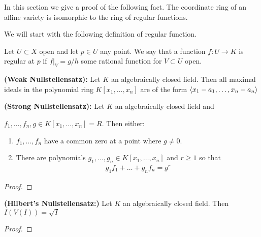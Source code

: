 \documentclass[12pt]{article}
\begin{document}
In this section we give a proof of the following fact. The coordinate ring of an affine variety is isomorphic to the ring of regular functions.

We will start with the following definition of regular function.
\begin{definition}
Let $U\subset X$ open and let $p\in U$ any point. We say that a function $f:U\to K$ is regular at $p$ if $f\vert_V = g/h$ some rational function for $V\subset U$ open.
\end{definition}


\hfill 

\begin{theorem}
\textbf{(Weak Nullstellensatz):} Let $K$ an algebraically closed field. Then all maximal ideals in the polynomial ring $K[x_1,\dots,x_n]$ are of the form $\langle{x_1-a_1,\dots,x_n-a_n}\rangle$
\end{theorem}

\begin{theorem}
\textbf{(Strong Nullstellensatz):} Let $K$ an algebraically closed field and

$f_1,\dots,f_n,g\in K[x_1,\dots,x_n] = R$. Then either:\begin{enumerate}
    \item $f_1,\dots,f_n$ have a common zero at a point where $g\neq 0$.
    \item There are polynomials $g_1,\dots,g_n\in K[x_1,\dots,x_n]$ and $r\geq 1$ so that\begin{align*}
        g_1f_1 + \dots + g_nf_n = g^r
    \end{align*}
\end{enumerate}
\end{theorem}

\begin{proof}
    
\end{proof}

\begin{theorem}
\textbf{(Hilbert's Nullstellensatz:)} Let $K$ an algebraically closed field. Then $I(V(I)) = \sqrt{I}$
\end{theorem}

\begin{proof}
    
\end{proof}
\end{document}
